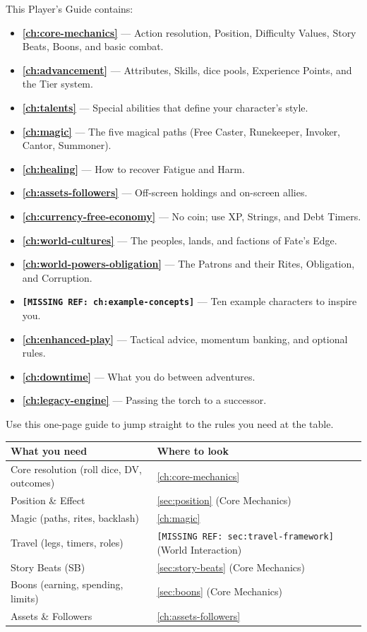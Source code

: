 This Player's Guide contains:
\begin{itemize}
\item \textbf{\autoref{ch:core-mechanics}} --- Action resolution, Position, Difficulty Values, Story Beats, Boons, and basic combat.
\item \textbf{\autoref{ch:advancement}} --- Attributes, Skills, dice pools, Experience Points, and the Tier system.
\item \textbf{\autoref{ch:talents}} --- Special abilities that define your character's style.
\item \textbf{\autoref{ch:magic}} --- The five magical paths (Free Caster, Runekeeper, Invoker, Cantor, Summoner).
\item \textbf{\autoref{ch:healing}} --- How to recover Fatigue and Harm.
\item \textbf{\autoref{ch:assets-followers}} --- Off-screen holdings and on-screen allies.
\item \textbf{\autoref{ch:currency-free-economy}} --- No coin; use XP, Strings, and Debt Timers.
\item \textbf{\autoref{ch:world-cultures}} --- The peoples, lands, and factions of Fate's Edge.
\item \textbf{\autoref{ch:world-powers-obligation}} --- The Patrons and their Rites, Obligation, and Corruption.
\item \textbf{\texttt{[MISSING REF: ch:example-concepts]}} --- Ten example characters to inspire you.
\item \textbf{\autoref{ch:enhanced-play}} --- Tactical advice, momentum banking, and optional rules.
\item \textbf{\autoref{ch:downtime}} --- What you do between adventures.
\item \textbf{\autoref{ch:legacy-engine}} --- Passing the torch to a successor.
\end{itemize}

\begin{tcolorbox}[colback=gray!5!white, colframe=gray!75!black, title=Quick Reference: Where to Find It,breakable]
Use this one-page guide to jump straight to the rules you need at the table.

\begin{tabularx}{\textwidth}{lX}
\toprule
\textbf{What you need} & \textbf{Where to look} \\
\midrule
Core resolution (roll dice, DV, outcomes) & \autoref{ch:core-mechanics} \\
Position \& Effect & \autoref{sec:position} (Core Mechanics) \\
Magic (paths, rites, backlash) & \autoref{ch:magic} \\
Travel (legs, timers, roles) & \texttt{[MISSING REF: sec:travel-framework]} (World Interaction) \\
Story Beats (SB) & \autoref{sec:story-beats} (Core Mechanics) \\
Boons (earning, spending, limits) & \autoref{sec:boons} (Core Mechanics) \\
Assets \& Followers & \autoref{ch:assets-followers} \\
\bottomrule
\end{tabularx}
\end{tcolorbox}

